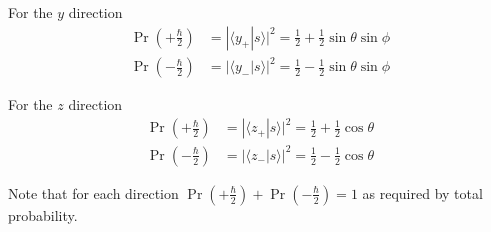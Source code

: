 For the $y$ direction
\begin{align*}
\Pr\left(+\tfrac{\hbar}{2}\right)&=|\langle y_+|s\rangle|^2=\tfrac{1}{2}+\tfrac{1}{2}\sin\theta\sin\phi
\\
\Pr\left(-\tfrac{\hbar}{2}\right)&=|\langle y_-|s\rangle|^2=\tfrac{1}{2}-\tfrac{1}{2}\sin\theta\sin\phi
\end{align*}

For the $z$ direction
\begin{align*}
\Pr\left(+\tfrac{\hbar}{2}\right)&=|\langle z_+|s\rangle|^2=\tfrac{1}{2}+\tfrac{1}{2}\cos\theta
\\
\Pr\left(-\tfrac{\hbar}{2}\right)&=|\langle z_-|s\rangle|^2=\tfrac{1}{2}-\tfrac{1}{2}\cos\theta
\end{align*}

Note that for each direction $\Pr\left(+\tfrac{\hbar}{2}\right)+\Pr\left(-\tfrac{\hbar}{2}\right)=1$
as required by total probability.


